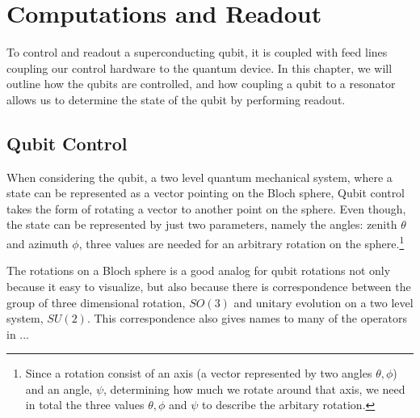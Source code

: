 \chapter{Computations and Readout}\label{sec:qubit-resonator}
To control and readout a superconducting qubit, it is coupled with feed lines coupling our control hardware to the quantum device. In this chapter, we will outline how the qubits are controlled, and how coupling a qubit to a resonator allows us to determine the state of the qubit by performing readout.


\section{Qubit Control}\label{sec:qubit_control}
When considering the qubit, a two level quantum mechanical system, where a state can be represented as a vector pointing on the Bloch sphere, Qubit control takes the form of rotating a vector to another point on the sphere. Even though, the state can be represented by just two parameters, namely the angles: zenith $\theta$ and azimuth $\phi$, three values are needed for an arbitrary rotation on the sphere.\footnote{Since a rotation consist of an axis (a vector represented by two angles $\theta, \phi$) and an angle, $\psi$, determining how much we rotate around that axis, we need in total the three values $\theta, \phi$ and $\psi$ to describe the arbitary rotation.}

The rotations on a Bloch sphere is a good analog for qubit rotations not only because it easy to visualize, but also because there is correspondence between the group of three dimensional rotation, $SO(3)$ and unitary evolution on a two level system, $SU(2)$. This correspondence also gives names to many of the operators in ... 

